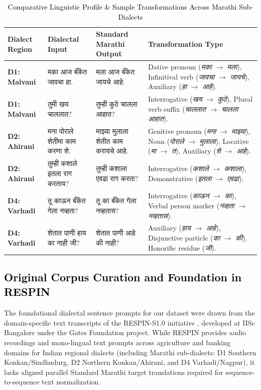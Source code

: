 \begin{table}[t]
\color{black}
\centering
\caption{\textcolor{black}{Comparative Linguistic Profile & Sample Transformations Across Marathi Sub-Dialects}}
\label{tab:dialect_linguistic_profiles}
\begin{tabularx}{\textwidth}{lXXX}
\hline
\textbf{Dialect Region} & \textbf{Dialectal Input} & \textbf{Standard Marathi Output} & \textbf{Transformation Type} \\
\hline
\textbf{D1: Malvani} & मका आज बँकेंत जावचा हा. & मला आज बँकेत जायचे आहे. & Dative pronoun (\emph{मका} $\rightarrow$ \emph{मला}), Infinitival verb (\emph{जावचा} $\rightarrow$ \emph{जायचे}), Auxiliary (\emph{हा} $\rightarrow$ \emph{आहे}). \\
\textbf{D1: Malvani} & तुमी खय चाललात? & तुम्ही कुठे चालला आहात? & Interrogative (\emph{खय} $\rightarrow$ \emph{कुठे}), Plural verb suffix (\emph{चाललात} $\rightarrow$ \emph{चालला आहात}). \\
\hline
\textbf{D2: Ahirani} & मना पोराले शेतीमा काम करणा शे. & माझ्या मुलाला शेतीत काम करायचे आहे. & Genitive pronoun (\emph{मना} $\rightarrow$ \emph{माझ्या}), Noun (\emph{पोराले} $\rightarrow$ \emph{मुलाला}), Locative (\emph{मा} $\rightarrow$ \emph{त}), Auxiliary (\emph{शे} $\rightarrow$ \emph{आहे}). \\
\textbf{D2: Ahirani} & तुम्ही कशाले इतला राग करताय? & तुम्ही कशाला एवढा राग करता? & Interrogative (\emph{कशाले} $\rightarrow$ \emph{कशाला}), Demonstrative (\emph{इतला} $\rightarrow$ \emph{एवढा}). \\
\hline
\textbf{D4: Varhadi} & तू काऊन बँकेंत गेला नव्हता? & तू का बँकेत गेला नव्हतास? & Interrogative (\emph{काऊन} $\rightarrow$ \emph{का}), Verbal person marker (\emph{नव्हता} $\rightarrow$ \emph{नव्हतास}). \\
\textbf{D4: Varhadi} & शेतात पाणी हाय का नाही जी? & शेतात पाणी आहे की नाही? & Auxiliary (\emph{हाय} $\rightarrow$ \emph{आहे}), Disjunctive particle (\emph{का} $\rightarrow$ \emph{की}), Honorific residue (\emph{जी}). \\
\hline
\end{tabularx}
\end{table}

\subsection{\textcolor{black}{Original Corpus Curation and Foundation in RESPIN}}

The foundational dialectal sentence prompts for our dataset were drawn from the domain-specific text transcripts of the RESPIN-S1.0 initiative \cite{kumar2025respin}, developed at IISc Bangalore under the Gates Foundation project. While RESPIN provides audio recordings and mono-lingual text prompts across agriculture and banking domains for Indian regional dialects (including Marathi sub-dialects: D1 Southern Konkan/Sindhudurg, D2 Northern Konkan/Ahirani, and D4 Varhadi/Nagpur), it lacks aligned parallel Standard Marathi target translations required for sequence-to-sequence text normalization.

